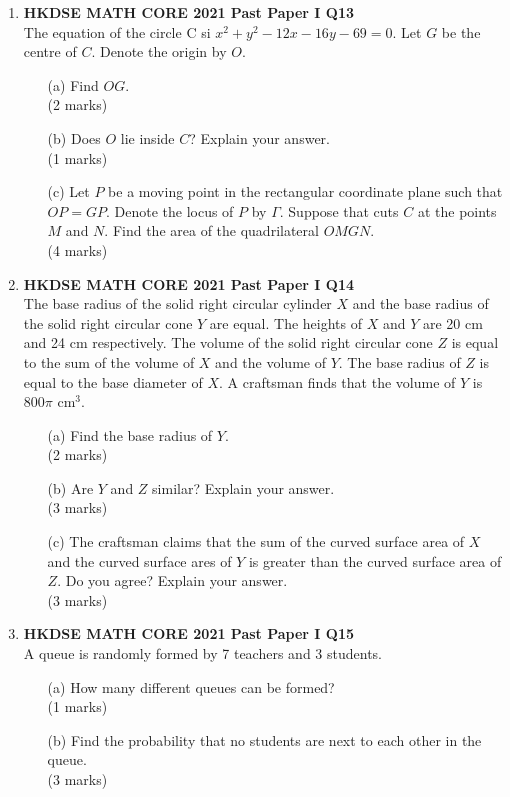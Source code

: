 \documentclass[12pt]{article}
\begin{document}
\begin{enumerate}
	\item \textbf{HKDSE MATH CORE 2021 Past Paper I Q13}\\
	The equation of the circle C si $x^2 +y^2 - 12x - 16y - 69 = 0$. Let $G$ be the centre of $C$. Denote the origin by $O$.
	\begin{enumerate}
		\item[(a)] Find $OG$. \\(2 marks)
		\item[(b)] Does $O$ lie inside $C$? Explain your answer. \\(1 marks)
		\item[(c)] Let $P$ be a moving point in the rectangular coordinate plane such that $OP = GP$. Denote the locus of $P$ by $\Gamma$. Suppose that cuts $C$ at the points $M$ and $N$. Find the area of the quadrilateral $OMGN$. \\(4 marks)
	\end{enumerate}

	\item \textbf{HKDSE MATH CORE 2021 Past Paper I Q14}\\
	The base radius of the solid right circular cylinder $X$ and the base radius of the solid right circular cone $Y$ are equal. The heights of $X$ and $Y$ are 20 cm and 24 cm respectively. The volume of the solid right circular cone $Z$ is equal to the sum of the volume of $X$ and the volume of $Y$. The base radius of $Z$ is equal to the base diameter of $X$. A craftsman finds that the volume of $Y$ is $800\pi$ cm$^3$.
	\begin{enumerate}
		\item[(a)] Find the base radius of $Y$. \\(2 marks)
		\item[(b)] Are $Y$ and $Z$ similar? Explain your answer. \\(3 marks)
		\item[(c)] The craftsman claims that the sum of the curved surface area of $X$ and the curved surface ares of $Y$ is greater than the curved surface area of $Z$. Do you agree? Explain your answer. \\(3 marks)
	\end{enumerate}

	\item \textbf{HKDSE MATH CORE 2021 Past Paper I Q15}\\
	A queue is randomly formed by 7 teachers and 3 students.
	\begin{enumerate}
		\item[(a)] How many different queues can be formed? \\(1 marks)
		\item[(b)] Find the probability that no students are next to each other in the queue. \\(3 marks)
	\end{enumerate}


\end{enumerate}
\end{document}
